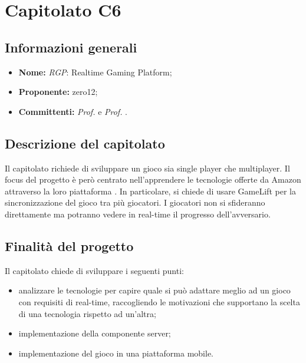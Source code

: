 \section{Capitolato C6}

\subsection{Informazioni generali}
\begin{itemize}
\item \textbf{Nome:} \textit{RGP}: Realtime Gaming Platform;
\item \textbf{Proponente:} zero12;
\item \textbf{Committenti:} \textit{Prof. \Tullio{}} e \textit{Prof. \Riccardo{}}.
\end{itemize}

\subsection{Descrizione del capitolato}
Il capitolato richiede di sviluppare un gioco sia single player che multiplayer.
Il focus del progetto è però centrato nell'apprendere le tecnologie offerte da Amazon attraverso la loro piattaforma .
In particolare, si chiede di usare  GameLift per la sincronizzazione del gioco tra più giocatori.
I giocatori non si sfideranno direttamente ma potranno vedere in real-time il progresso dell'avversario.

\subsection{Finalità del progetto}
Il capitolato chiede di sviluppare i seguenti punti:
\begin{itemize}
\item analizzare le tecnologie  per capire quale si può adattare meglio ad un gioco con requisiti di real-time, raccogliendo le motivazioni che supportano la scelta di una tecnologia rispetto ad un'altra;
\item implementazione della componente server;
\item implementazione del gioco in una piattaforma mobile.
\end{itemize}

